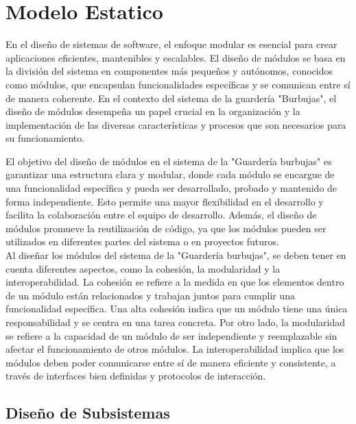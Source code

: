 \chapter{Modelo Estatico}	

En el diseño de sistemas de software, el enfoque modular es esencial para crear aplicaciones eficientes, mantenibles y escalables. El diseño de módulos se basa en la división del sistema en componentes más pequeños y autónomos, conocidos como módulos, que encapsulan funcionalidades específicas y se comunican entre sí de manera coherente. En el contexto del sistema de la guardería "Burbujas", el diseño de módulos desempeña un papel crucial en la organización y la implementación de las diversas características y procesos que son necesarios para su funcionamiento.

El objetivo del diseño de módulos en el sistema de la "Guardería burbujas" es garantizar una estructura clara y modular, donde cada módulo se encargue de una funcionalidad específica y pueda ser desarrollado, probado y mantenido de forma independiente. Esto permite una mayor flexibilidad en el desarrollo y facilita la colaboración entre el equipo de desarrollo. Además, el diseño de módulos promueve la reutilización de código, ya que los módulos pueden ser utilizados en diferentes partes del sistema o en proyectos futuros.
\\

Al diseñar los módulos del sistema de la "Guardería burbujas", se deben tener en cuenta diferentes aspectos, como la cohesión, la modularidad y la interoperabilidad. La cohesión se refiere a la medida en que los elementos dentro de un módulo están relacionados y trabajan juntos para cumplir una funcionalidad específica. Una alta cohesión indica que un módulo tiene una única responsabilidad y se centra en una tarea concreta. Por otro lado, la modularidad se refiere a la capacidad de un módulo de ser independiente y reemplazable sin afectar el funcionamiento de otros módulos. La interoperabilidad implica que los módulos deben poder comunicarse entre sí de manera eficiente y consistente, a través de interfaces bien definidas y protocolos de interacción.

\section{Diseño de Subsistemas}

